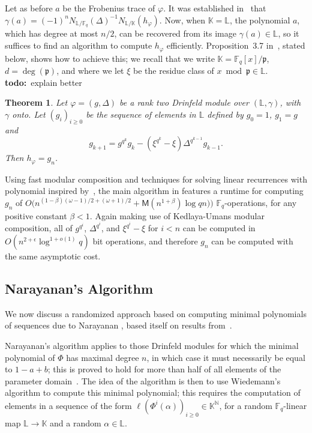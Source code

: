 \documentclass[sigconf]{acmart}
\newtheorem{theorem}{Theorem}
\newcommand{\M}{\mathsf{M}}
\newcommand{\K}{\mathbb{K}}
\newcommand{\F}{\mathbb{F}}
\newcommand{\N}{\mathbb{N}}
\renewcommand{\L}{\mathbb{L}}
\newcommand{\frakp}{\mathfrak{p}}
\newcommand{\todo}{{\bf todo:}~}
\begin{document}
Let as before $a$ be the Frobenius trace of $\varphi$. It was established
in~\cite{Gekeler83} that $\gamma(a)= (-1)^n N_{\L/\F_q}(\Delta)^{-1}
N_{\L/\K}(h_\varphi)$. Now, when $\K=\L$, the polynomial $a$, which has
degree at most $n/2$, can be recovered from its image $\gamma(a) \in
\L$, so it suffices to find an algorithm to compute $h_\varphi$
efficiently. Proposition~3.7 in~\cite{frobdist}, stated below, shows
how to achieve this; we recall that we write $\K=\F_q[x]/\frakp$,
$d=\deg(\frakp)$, and where we let $\xi$ be the residue class of $x
\bmod \frakp \in \L$. \todo{explain better}
\begin{theorem}
  Let $\varphi=(g,\Delta)$ be a rank two Drinfeld module over
  $(\L,\gamma)$, with $\gamma$ onto. Let $(g_i)_{i \ge 0}$ be the
  sequence of elements in $\L$ defined by $g_0 = 1$, $g_1 = g$ and
  \[ g_{k+1} = g^{q^{k}} g_{k} - (\xi^{q^{k}} - \xi) \Delta^{q^{k-1}} g_{k-1}.\]
  Then $h_{\varphi} = g_n$.
\end{theorem}

Using fast modular composition and techniques for solving linear
recurrences with polynomial inspired by~\cite{xxx}, the main algorithm
in \cite{eschost2017arXiv171200669D} features a runtime for computing
$g_n$ of $O\big(n^{(1-\beta)(\omega - 1)/2 + (\omega + 1)/2 } +
\M(n^{1 + \beta}) \log qn) \big)$ $\F_q$-operations, for any positive
constant $\beta < 1$. Again making use of Kedlaya-Umans modular
composition, all of $g^{q^i}$, $\Delta^{q^i}$, and $\xi^{q^i} - \xi$
for $i < n$ can be computed in $O( n^{2 + \epsilon} \log^{1 + o(1)}
q)$ bit operations, and therefore $g_n$ can be computed with the same
asymptotic cost.


\subsection{Narayanan's Algorithm}

We now discuss a randomized approach based on computing minimal
polynomials of sequences due to Narayanan
\cite[Section~3.1]{DBLP:journals/corr/Narayanan15}, based itself on
results from~\cite{GEKELE1991187}.

Narayanan's algorithm applies to those Drinfeld modules for which the
minimal polynomial of $\Phi$ has maximal degree $n$, in which case it
must necessarily be equal to $1-a+b$; this is proved to hold for more
than half of all elements of the parameter domain~\cite[theorem
  3.6]{DBLP:journals/corr/Narayanan15}. The idea of the algorithm is
then to use Wiedemann's algorithm to compute this minimal polynomial;
this requires the computation of elements in a sequence of the form
$\ell(\Phi^i(\alpha))_{i\ge 0} \in \K^\N$, for a random $\F_q$-linear
map $\L\to\K$ and a random $\alpha \in \L$.
\end{document}
